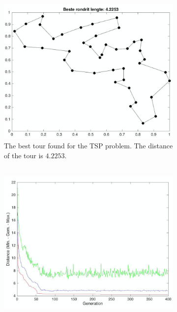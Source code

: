 
\begin{figure}[!]
\centering
\begin{subfigure}{.5\textwidth}
  \centering
  \includegraphics[width=.88\linewidth]{../figures/figures_question_4/belgium_tour_path}
  \caption{The best tour found for the TSP problem. The distance of the tour is $4.2253$.\\ \ \\}
  \label{fig:belgium_tour_4_path}
\end{subfigure}%
\begin{subfigure}{.5\textwidth}
  \centering
  \includegraphics[width=.9\linewidth]{../figures/figures_question_4/belgium_tour_gen}

\end{subfigure}
\end{figure}
